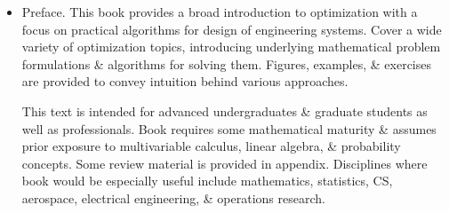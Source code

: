 \documentclass{article}
\begin{document}
\begin{itemize}
	\item {\sf Preface.} This book provides a broad introduction to optimization with a focus on practical algorithms for design of engineering systems. Cover a wide variety of optimization topics, introducing underlying mathematical problem formulations \& algorithms for solving them. Figures, examples, \& exercises are provided to convey intuition behind various approaches.

	This text is intended for advanced undergraduates \& graduate students as well as professionals. Book requires some mathematical maturity \& assumes prior exposure to multivariable calculus, linear algebra, \& probability concepts. Some review material is provided in appendix. Disciplines where book would be especially useful include mathematics, statistics, CS, aerospace, electrical engineering, \& operations research.


\end{itemize}
\end{document}
